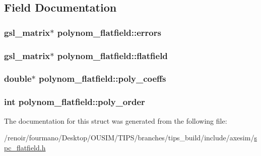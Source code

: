\subsection{Field Documentation}
\hypertarget{structpolynom__flatfield_a7cb096f2701bd64b8f57d27aef51e8ce}{
\subsubsection[{errors}]{\setlength{\rightskip}{0pt plus 5cm}gsl\_\-matrix$\ast$ {\bf polynom\_\-flatfield::errors}}}
\label{structpolynom__flatfield_a7cb096f2701bd64b8f57d27aef51e8ce}
\hypertarget{structpolynom__flatfield_a489ee68b385052b07372fa0ae768106c}{
\subsubsection[{flatfield}]{\setlength{\rightskip}{0pt plus 5cm}gsl\_\-matrix$\ast$ {\bf polynom\_\-flatfield::flatfield}}}
\label{structpolynom__flatfield_a489ee68b385052b07372fa0ae768106c}
\hypertarget{structpolynom__flatfield_a1c036a8e0217763384459507643a5f80}{
\subsubsection[{poly\_\-coeffs}]{\setlength{\rightskip}{0pt plus 5cm}double$\ast$ {\bf polynom\_\-flatfield::poly\_\-coeffs}}}
\label{structpolynom__flatfield_a1c036a8e0217763384459507643a5f80}
\hypertarget{structpolynom__flatfield_adb6281055bfa0626320e1c79ca284a77}{
\subsubsection[{poly\_\-order}]{\setlength{\rightskip}{0pt plus 5cm}int {\bf polynom\_\-flatfield::poly\_\-order}}}
\label{structpolynom__flatfield_adb6281055bfa0626320e1c79ca284a77}


The documentation for this struct was generated from the following file:\begin{DoxyCompactItemize}
\item 
/renoir/fourmano/Desktop/OUSIM/TIPS/branches/tips\_\-build/include/axesim/\hyperlink{spc__flatfield_8h}{spc\_\-flatfield.h}\end{DoxyCompactItemize}
